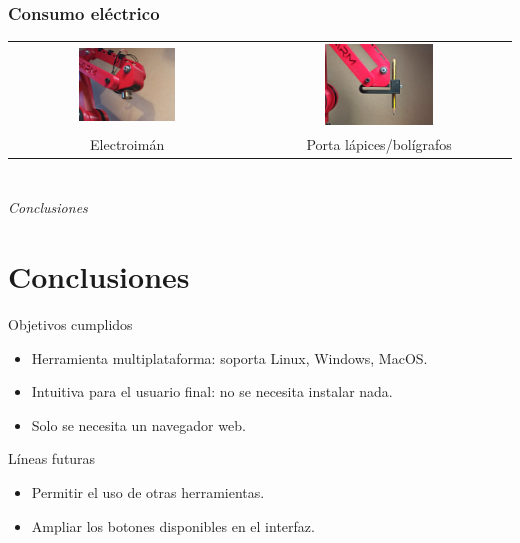 \documentclass{beamer}
\begin{document}
\begin{frame}
  \frametitle{Consumo eléctrico}
  \begin{table}[htbp]
    \centering
    \begin{tabular}{cc}
        \includegraphics[width=0.43\textwidth, valign=m]{figs/electromagnet_tool.jpeg} & \includegraphics[width=0.43\textwidth, valign=m]{figs/pen_tool.jpg}  \\
        Electroimán & Porta lápices/bolígrafos
    \end{tabular}
  \end{table}  
\end{frame}

\section*{}
\begin{frame}{}
  \centering \Huge
  \emph{Conclusiones}
\end{frame}

\section{Conclusiones}
\begin{frame}
\begin{block}{Objetivos cumplidos}
\begin{itemize}
\item Herramienta multiplataforma: soporta Linux, Windows, MacOS.
\item Intuitiva para el usuario final: no se necesita instalar nada.
\item Solo se necesita un navegador web.
\end{itemize}
\end{block}

\begin{block}{Líneas futuras}
\begin{itemize}
\item Permitir el uso de otras herramientas.
\item Ampliar los botones disponibles en el interfaz.
\end{itemize}
\end{block}
\end{frame}

\begin{frame}[plain]
\large{\titlepage}
\end{frame}
\end{document}
